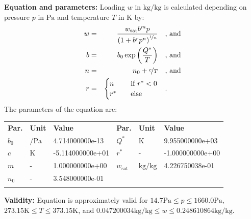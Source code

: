 \textbf{Equation and parameters:}
\newline
%
Loading $w$ in $\si{\kilogram\per\kilogram}$ is calculated depending on pressure $p$ in $\si{\pascal}$ and temperature $T$ in $\si{\kelvin}$ by:
%
\begin{equation*}
\begin{split}
w &=& \frac{w_\mathrm{sat} b^{m} p}{\left( 1 + b^{r} p^{n} \right)^{\nicefrac{1}{n}}} & \quad\text{, and} \\
b &=& b_0 \exp\left( \frac{Q^{*}}{T} \right) & \quad\text{, and} \\
n &=& n_0 + \nicefrac{c}{T} & \quad\text{, and} \\
r &=& \begin{cases} n & \quad \text{if } r^{*} < 0 \\ r^{*}  & \quad \text{else} \end{cases} & \quad\text{.}
\end{split}
\end{equation*}
%
The parameters of the equation are:
%
\begin{longtable}[l]{lll|lll}
\toprule
\addlinespace
\textbf{Par.} & \textbf{Unit} & \textbf{Value} &	\textbf{Par.} & \textbf{Unit} & \textbf{Value} \\
\addlinespace
\midrule
\endhead

\bottomrule
\endfoot
\bottomrule
\endlastfoot
\addlinespace

$b_0$ & $\si{\per\pascal}$ & 4.714000000e-13 & $Q^{*}$ & $\si{\kelvin}$ & 9.955000000e+03 \\
$c$ & $\si{\kelvin}$ & -5.114000000e+01 & $r^{*}$ & - & -1.000000000e+00 \\
$m$ & - & 1.000000000e+00 & $w_\mathrm{sat}$ & $\si{\kilogram\per\kilogram}$ & 4.226750038e-01 \\
$n_0$ & - & 3.548000000e-01 & & & \\

\addlinespace\end{longtable}

\textbf{Validity:}
\newline
Equation is approximately valid for $14.7 \si{\pascal} \leq p \leq 1660.0 \si{\pascal}$,  $273.15 \si{\kelvin} \leq T \leq 373.15 \si{\kelvin}$, and $0.047200034 \si{\kilogram\per\kilogram} \leq w \leq 0.248610864 \si{\kilogram\per\kilogram}$.
\newline

